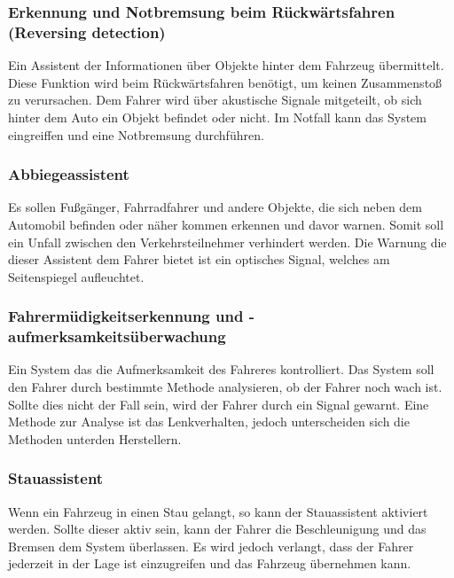         \subsubsection{Erkennung und Notbremsung beim Rückwärtsfahren (Reversing detection)}
        Ein Assistent der Informationen über Objekte hinter dem Fahrzeug übermittelt. Diese Funktion
        wird beim Rückwärtsfahren benötigt, um keinen Zusammenstoß zu verursachen. Dem Fahrer wird 
        über akustische Signale mitgeteilt, ob sich hinter dem Auto ein Objekt befindet oder nicht.
        Im Notfall kann das System eingreiffen und eine Notbremsung durchführen.
        ~\cite{assistenzsysteme.PB2}  ~\cite{reversedetection.PB1}

        \subsubsection{Abbiegeassistent}
        Es sollen Fußgänger, Fahrradfahrer und andere Objekte, die sich neben dem Automobil befinden
        oder näher kommen erkennen und davor warnen. Somit soll ein Unfall zwischen den Verkehrsteilnehmer
        verhindert werden. Die Warnung die dieser Assistent dem Fahrer bietet ist ein optisches Signal,
        welches am Seitenspiegel aufleuchtet.
        ~\cite{assistenzsysteme.PB2} ~\cite{abbiegeassi.PB1} ~\cite{abbiegeassi.PB2}

        \subsubsection{Fahrermüdigkeitserkennung und -aufmerksamkeitsüberwachung}
        Ein System das die Aufmerksamkeit des Fahreres kontrolliert. Das System soll den Fahrer durch
        bestimmte Methode analysieren, ob der Fahrer noch wach ist. Sollte dies nicht der Fall sein,
        wird der Fahrer durch ein Signal gewarnt. Eine Methode zur Analyse ist das Lenkverhalten, jedoch
        unterscheiden sich die Methoden unterden Herstellern.
        ~\cite{muedigkeitsassi.PB1} ~\cite{assistenzsysteme.PB1}  ~\cite{assistenzsysteme.PB2}
        ~\cite{muedigkeitsassi.PB2}
        
        \subsubsection{Stauassistent}
        Wenn ein Fahrzeug in einen Stau gelangt, so kann der Stauassistent aktiviert werden. Sollte dieser
        aktiv sein, kann der Fahrer die Beschleunigung und das Bremsen dem System überlassen. Es wird
        jedoch verlangt, dass der Fahrer jederzeit in der Lage ist einzugreifen und das Fahrzeug übernehmen
        kann.
        ~\cite{stauassi.PB1} ~\cite{stauassi.PB2}
        
